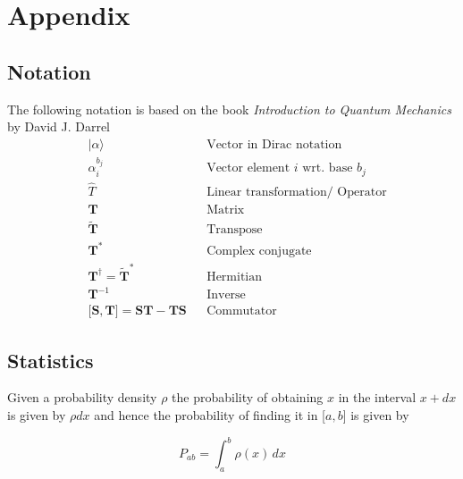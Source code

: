 
\section{Appendix}
\subsection{Notation}
The following notation is based on the book \textit{Introduction to Quantum Mechanics} by David J. Darrel
\begin{align*}
     & \lvert \alpha \rangle                                             &  & \text{Vector in Dirac notation}           \\
     & \alpha_i^{b_j}                                                    &  & \text{Vector element $i$ wrt.\ base } b_j \\
     & \widehat{T}                                                       &  & \text{Linear transformation/ Operator}    \\
     & \mathbf{T}                                                        &  & \text{Matrix}                             \\
     & \widetilde{\mathbf{T}}                                            &  & \text{Transpose}                          \\
     & \mathbf{T}^*                                                      &  & \text{Complex conjugate}                  \\
     & \mathbf{T}^\dagger = {\widetilde{\mathbf{T}}}^*                   &  & \text{Hermitian}                          \\
     & \mathbf{T}^{-1}                                                   &  & \text{Inverse}                            \\
     & \lbrack \mathbf{S},\mathbf{T} \rbrack = \mathbf{ST} - \mathbf{TS} &  & \text{Commutator}
\end{align*}

\subsection{Statistics}
Given a probability density $\rho$ the probability of obtaining $x$ in the interval $x+dx$ is given by $\rho dx$ and hence the probability of finding it in [$a,b$] is given by

\begin{equation*}
    P_{ab}=\int_{a}^{b} \rho(x)\, dx
\end{equation*}

